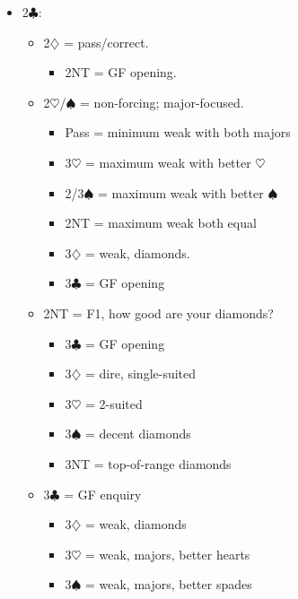 \documentclass[a4paper,14pt]{extarticle}
\begin{document}
\begin{itemize}
\item 2$\clubsuit$:
	\begin{itemize}
   \item 2$\diamondsuit$ = pass/correct.
		\begin{itemize}
      \item 2NT = GF opening.
		\end{itemize}
   \item 2$\heartsuit$/$\spadesuit$ = non-forcing; major-focused.
		\begin{itemize}
		\item Pass = minimum weak with both majors
		\item 3$\heartsuit$ = maximum weak with better $\heartsuit$
		\item 2/3$\spadesuit$ = maximum weak with better $\spadesuit$
		\item 2NT = maximum weak both equal
		\item 3$\diamondsuit$ = weak, diamonds.
		\item 3$\clubsuit$ = GF opening
		\end{itemize}
	\item 2NT = F1, how good are your diamonds?
		\begin{itemize}
		\item 3$\clubsuit$ = GF opening
 		\item 3$\diamondsuit$ = dire, single-suited
		\item 3$\heartsuit$ = 2-suited
		\item 3$\spadesuit$ = decent diamonds
		\item 3NT = top-of-range diamonds
		\end{itemize}
	\item 3$\clubsuit$ = GF enquiry
		\begin{itemize}
		\item 3$\diamondsuit$ = weak, diamonds
		\item 3$\heartsuit$ = weak, majors, better hearts
		\item 3$\spadesuit$ = weak, majors, better spades
		\end{itemize}

	\end{itemize}

\newpage


\end{itemize}
\end{document}
